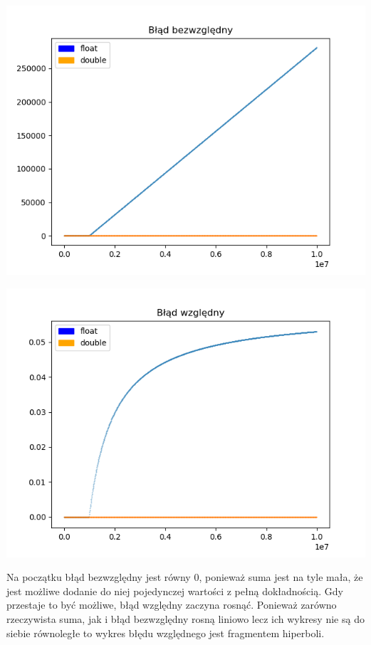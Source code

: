 \documentclass[11pt, a4paper]{article}
\begin{document}
\begin{center}
\includegraphics[scale = 0.7]{abs_error_label}\\
\end{center}
\begin{center}
\includegraphics[scale = 0.7]{rel_error_label}\\
\end{center}
Na początku błąd bezwzględny jest równy \begin{math} 0 \end{math}, ponieważ suma jest na tyle mała, że jest możliwe dodanie do niej pojedynczej wartości z pełną dokładnością. Gdy przestaje to być możliwe, błąd względny zaczyna rosnąć. Ponieważ zarówno rzeczywista suma, jak i błąd bezwzględny rosną liniowo lecz ich wykresy nie są do siebie równoległe to wykres błędu względnego jest fragmentem hiperboli.\\
\end{document}
